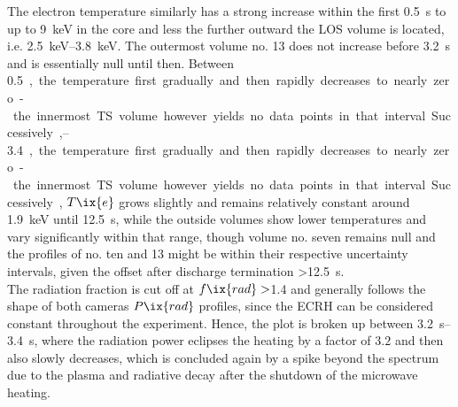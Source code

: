             The electron temperature similarly has a strong increase within the first \SI{0.5}{\second} to up to \SI{9}{\kilo\electronvolt} in the core and less the further outward the LOS volume is located, i.e. \SIrange{2.5}{3.8}{\kilo\electronvolt}. The outermost volume no. 13 does not increase before \SI{3.2}{\second} and is essentially null until then. Between \SIrange{0.5}{3.4}, the temperature first gradually and then rapidly decreases to nearly zero - the innermost TS volume however yields no data points in that interval. Successively, $T\ix{e}$ grows slightly and remains relatively constant around \SI{1.9}{\kilo\electronvolt} until \SI{12.5}{\second}, while the outside volumes show lower temperatures and vary significantly within that range, though volume no. seven remains null and the profiles of no. ten and 13 might be within their respective uncertainty intervals, given the offset after discharge termination >\SI{12.5}{\second}.\\%
            The radiation fraction is cut off at $f\ix{rad}>$\SI{1.4}{\arbitraryunit} and generally follows the shape of both cameras $P\ix{rad}$ profiles, since the ECRH can be considered constant throughout the experiment. Hence, the plot is broken up between \SIrange{3.2}{3.4}{\second}, where the radiation power eclipses the heating by a factor of $3.2$ and then also slowly decreases, which is concluded again by a spike beyond the spectrum due to the plasma and radiative decay after the shutdown of the microwave heating.\\%
%
